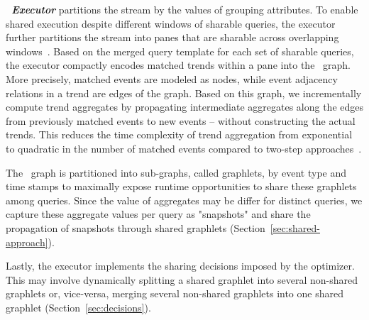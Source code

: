 \textbf{\textit{\app\ Executor}}  partitions the stream by the values of grouping attributes. To enable shared execution despite different windows of sharable queries, the executor further partitions the stream into panes that are sharable across overlapping windows~\cite{AW04, GSCL12, KWF06, LMTPT05}. Based on the merged query template for each set of sharable queries, the executor compactly encodes matched trends  
within a pane into the \app\ graph.
More precisely, matched events are modeled as  nodes, while event adjacency relations in a trend are edges of the graph.
%
%
Based on this graph, we incrementally compute trend aggregates by propagating intermediate aggregates along the edges from previously matched events to new events
-- without constructing the actual trends. 
This reduces the time complexity of trend aggregation from exponential to quadratic in the number of matched events compared to two-step approaches~\cite{hong2009rule,KS19,PLAR17,ZDI14}.



The \app\ graph is partitioned into sub-graphs, called graphlets, by event type and time stamps to maximally expose runtime opportunities to share these graphlets among  queries. 
Since the value of aggregates may be differ  for distinct
 queries, we capture these aggregate values per query as "snapshots" and share the propagation of snapshots through  shared graphlets (Section~\ref{sec:shared-approach}). 

Lastly, the executor implements the sharing decisions imposed by the optimizer. This may involve dynamically splitting a shared graphlet into several non-shared graphlets or, vice-versa, merging several non-shared graphlets into one shared graphlet (Section~\ref{sec:decisions}).


